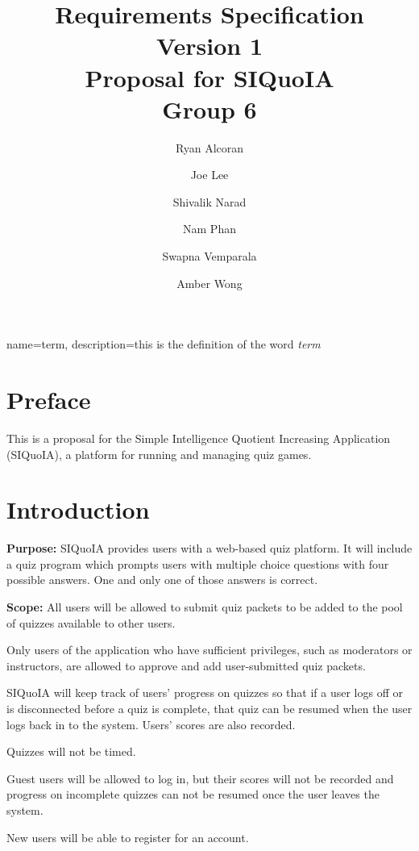 \documentclass[12pt]{article}
\begin{document}
\title{Requirements Specification \\ {\large Version 1} \\[1em] {\large
    Proposal for SIQuoIA} \\[1em] Group 6}

\author{ Ryan Alcoran \and Joe Lee \and Shivalik Narad \and Nam Phan
  \and Swapna Vemparala \and Amber Wong }

\maketitle

{
  name=term,
  description={this is the definition of the word {\it term}}
}


\section{Preface}
This is a proposal for the Simple Intelligence Quotient Increasing
Application (SIQuoIA), a platform for running and managing quiz games.

\section{Introduction}
{\bf Purpose:} SIQuoIA provides users with a web-based quiz
platform. It will include a quiz program which prompts users with
multiple choice questions with four possible answers. One and only one
of those answers is correct.

{\bf Scope:} All users will be allowed to submit quiz packets to be
added to the pool of quizzes available to other users.

Only users of the application who have sufficient privileges, such as
moderators or instructors, are allowed to approve and add
user-submitted quiz packets.

SIQuoIA will keep track of users' progress on quizzes so that if a
user logs off or is disconnected before a quiz is complete, that quiz
can be resumed when the user logs back in to the system. Users' scores
are also recorded.

Quizzes will not be timed.

Guest users will be allowed to log in, but their scores will not be
recorded and progress on incomplete quizzes can not be resumed once
the user leaves the system.

New users will be able to register for an account.
\end{document}
